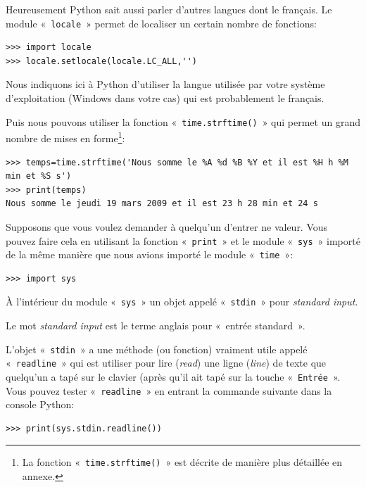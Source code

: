 Heureusement Python sait aussi parler d'autres langues dont le français. Le module «~\texttt{locale}~» permet de localiser un certain nombre de fonctions:

\begin{Verbatim}[frame=single,rulecolor=\color{mbleu}, label=à taper]
>>> import locale
>>> locale.setlocale(locale.LC_ALL,'')
\end{Verbatim}

Nous indiquons ici à Python d'utiliser la langue utilisée par votre système d'exploitation (Windows dans votre cas) qui est probablement le français.

Puis nous pouvons utiliser la fonction «~\texttt{time.strftime()}~» qui permet un grand nombre de mises en forme\footnote{La fonction «~\texttt{time.strftime()}~» est décrite de manière plus détaillée en annexe.}:

\begin{small}
\begin{Verbatim}[frame=single,rulecolor=\color{mbleu}, label=à taper]
>>> temps=time.strftime('Nous somme le %A %d %B %Y et il est %H h %M min et %S s')
>>> print(temps)
Nous somme le jeudi 19 mars 2009 et il est 23 h 28 min et 24 s
\end{Verbatim}
\end{small}

Supposons que vous voulez demander à quelqu'un d'entrer ne valeur. Vous pouvez faire cela en utilisant la fonction
«~\texttt{print}~» et le module «~\texttt{sys}~» importé de la même manière que nous avions importé le module «~\texttt{time}~»: 

\begin{Verbatim}[frame=single,rulecolor=\color{mbleu}, label=à taper]
>>> import sys
\end{Verbatim}

À l'intérieur du module «~\texttt{sys}~» un objet appelé «~\texttt{stdin}~» pour \emph{standard input}.

Le mot \emph{standard input} est le terme anglais pour «~entrée standard~».

L'objet «~\texttt{stdin}~» a une méthode (ou fonction) vraiment utile appelé  «~\texttt{readline}~» qui est utiliser pour lire (\emph{read}) une ligne (\emph{line}) de texte que quelqu'un a tapé sur le clavier (après qu'il ait tapé sur la touche «~\texttt{Entrée}~». Vous pouvez tester «~\texttt{readline}~» en entrant la commande suivante dans la console Python:

\begin{Verbatim}[frame=single,rulecolor=\color{mbleu}, label=à taper]
>>> print(sys.stdin.readline())
\end{Verbatim}

